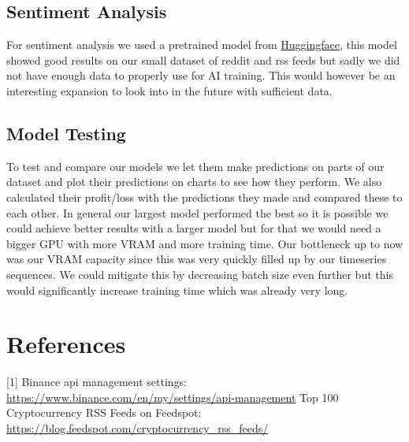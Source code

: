 \documentclass[12pt,a4paper]{article}
\begin{document}
\subsection{Sentiment Analysis}

For sentiment analysis we used a pretrained model from \href{https://huggingface.co/siebert/sentiment-roberta-large-english}{Huggingface}, this model showed good results on our small dataset of reddit and rss feeds but sadly we did not have enough data to properly use for AI training. This would however be an interesting expansion to look into in the future with sufficient data.

\subsection{Model Testing}

To test and compare our models we let them make predictions on parts of our dataset and plot their predictions on charts to see how they perform. We also calculated their profit/loss with the predictions they made and compared these to each other. In general our largest model performed the best so it is possible we could achieve better results with a larger model but for that we would need a bigger GPU with more VRAM and more training time. Our bottleneck up to now was our VRAM capacity since this was very quickly filled up by our timeseries sequences. We could mitigate this by decreasing batch size even further but this would significantly increase training time which was already very long.

\section{References}
[1] Binance api management settings: \newline \href{https://www.binance.com/en/my/settings/api-management}{https://www.binance.com/en/my/settings/api-management}
\newline
[2] Top 100 Cryptocurrency RSS Feeds on Feedspot: \newline \href{https://blog.feedspot.com/cryptocurrency_rss_feeds/}{https://blog.feedspot.com/cryptocurrency\_rss\_feeds/}
\end{document}
